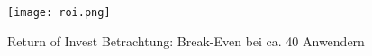 \begin{figure}[H]
    \centering
    \texttt{[image: roi.png]}
    \caption{Return of Invest Betrachtung: Break-Even bei ca. 40 Anwendern}
    \label{fig:roi}
\end{figure}









\pagebreak

